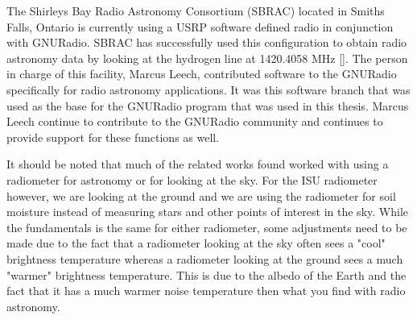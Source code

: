 The Shirleys Bay Radio Astronomy Consortium (SBRAC) located in Smiths Falls, Ontario is currently using a USRP software defined radio in conjunction with GNURadio.  SBRAC has successfully used this configuration to obtain radio astronomy data by looking at the hydrogen line at 1420.4058 MHz [\cite{Leech2007}].  The person in charge of this facility, Marcus Leech, contributed software to the GNURadio specifically for radio astronomy applications.  It was this software branch that was used as the base for the GNURadio program that was used in this thesis.  Marcus Leech continue to contribute to the GNURadio community and continues to provide support for these functions as well.

It should be noted that much of the related works found worked with using a radiometer for astronomy or for looking at the sky.  For the ISU radiometer however, we are looking at the ground and we are using the radiometer for soil moisture instead of measuring stars and other points of interest in the sky.  While the fundamentals is the same for either radiometer, some adjustments need to be made due to the fact that a radiometer looking at the sky often sees a "cool" brightness temperature whereas a radiometer looking at the ground sees a much "warmer" brightness temperature.  This is due to the albedo of the Earth and the fact that it has a much warmer noise temperature then what you find with radio astronomy.

